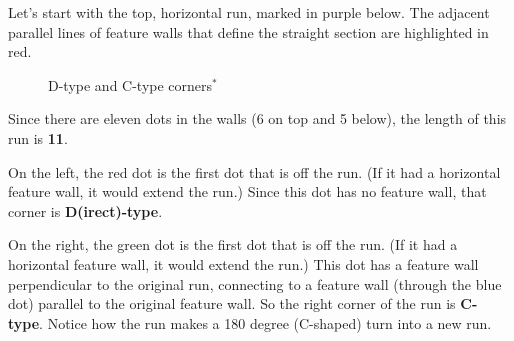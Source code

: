 \documentclass[openany]{book}
\newcommand{\gen}{\hyperref[generated]{$^*$}}%
\begin{document}
Let's start with the top, horizontal run, marked in purple below. The adjacent parallel lines of feature walls that define the straight section are highlighted in red.

\begin{figure}[H]\centering
{}
\caption{D-type and C-type corners\gen}
\end{figure}
Since there are eleven dots in the walls (6 on top and 5 below), the length of this run is \textbf{11}.

On the left, the red dot is the first dot that is off the run. (If it had a horizontal feature wall, it would extend the run.) Since this dot has no feature wall, that corner is \textbf{D(irect)-type}.

On the right, the green dot is the first dot that is off the run. (If it had a horizontal feature wall, it would extend the run.) This dot has a feature wall perpendicular to the original run, connecting to a feature wall (through the blue dot) parallel to the original feature wall. So the right corner of the run is \textbf{C-type}. Notice how the run makes a 180 degree (C-shaped) turn into a new run. 
\medskip
\end{document}
